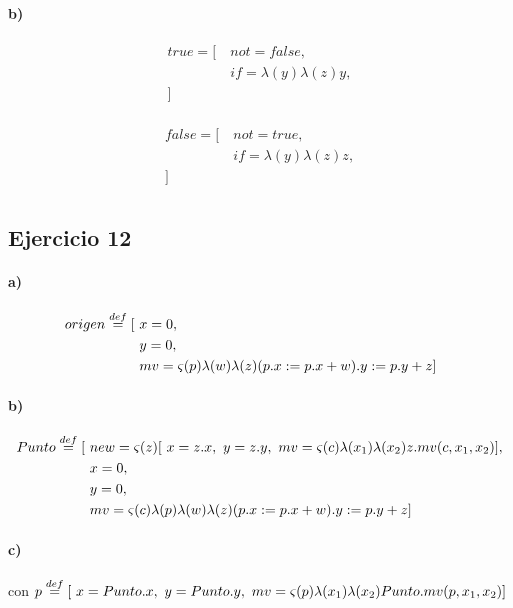 \documentclass[10pt,a4paper]{article}
\begin{document}
\paragraph{b)}
\begin{multicols}{2}
\begin{align*}
true = [~&not = false,  \\
&if = \lambda(y)\lambda(z)y, \\
]~& \\
\end{align*}

\begin{align*}
false = [~&not = true,  \\
&if = \lambda(y)\lambda(z)z, \\
]~& \\
\end{align*}
\end{multicols}
\setlength{\columnsep}{5mm}
\subsection{Ejercicio 12}
\paragraph{a)}
\begin{align*}
origen \overset{def}{=} [~& x = 0, \\
 & y = 0, \\
 & mv = \varsigma(p)\lambda(w)\lambda(z) (p.x:=p.x+w).y:=p.y+z
 ]~& \\
\end{align*}
\paragraph{b)}
\begin{align*}
Punto \overset{def}{=} [~& new = \varsigma(z)[~x= z.x,~y = z.y,~ mv = \varsigma(c)\lambda(x_1)\lambda(x_2) z.mv(c,x_1,x_2)]
, \\
& x = 0, \\
& y = 0, \\
& mv = \varsigma(c)\lambda(p)\lambda(w)\lambda(z) (p.x:=p.x+w).y:=p.y+z ] \\
\end{align*}

\paragraph{c)}
	\vspace{5mm}
	\begin{center}\small
		\begin{scprooftree}
		\def\extraVskip{5pt}


    \RightLabel{[Sel]}
		\end{scprooftree}    
	\end{center}
	con $p \overset{def}{=} [~x=Punto.x,~y = Punto.y,~ mv = \varsigma(p)\lambda(x_1)\lambda(x_2) Punto.mv(p,x_1,x_2)]$
\end{document}

